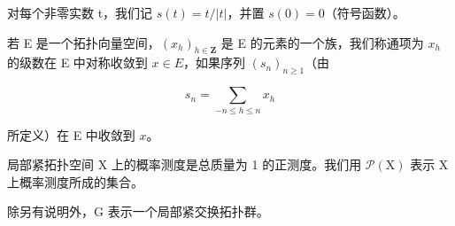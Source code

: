 对每个非零实数 t，我们记 \(s(t) = t/|t|\)，并置 \(s(0) = 0\)（符号函数）。

若 E 是一个拓扑向量空间，\((x_{h})_{h\in\mathbf{Z}}\) 是 E 的元素的一个族，我们称通项为 \(x_{h}\) 的级数在 E 中对称收敛到 \(x\in E\)，如果序列 \((s_{n})_{n\geqslant1}\)（由

\[
s _ {n} = \sum_ {- n \leqslant h \leqslant n} x _ {h}
\]

所定义）在 E 中收敛到 \(x\)。

局部紧拓扑空间 X 上的概率测度是总质量为 1 的正测度。我们用 \(\mathcal{P}(\mathrm{X})\) 表示 X 上概率测度所成的集合。

除另有说明外，G 表示一个局部紧交换拓扑群。
